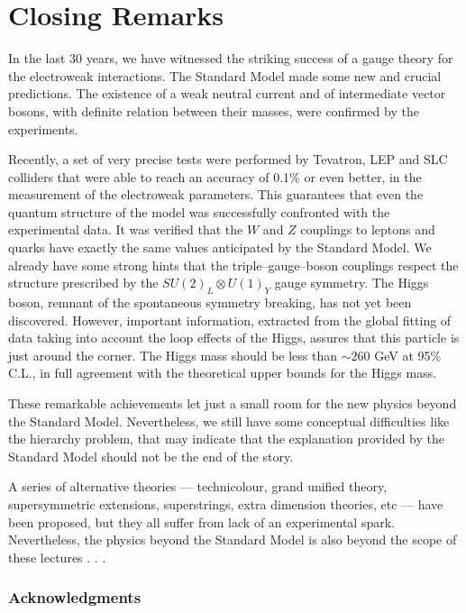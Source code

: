 \documentclass[12pt]{report}
\newcommand{\linha}{\enlargethispage{1\baselineskip}}
\begin{document}
\chapter{Closing Remarks} \indent

In the last 30 years, we have witnessed the striking success of a
gauge theory for the electroweak interactions. The Standard Model
made  some new and crucial predictions. The existence of a weak
neutral current and of intermediate vector bosons, with definite
relation between their masses, were confirmed by the experiments. 

Recently, a set of very precise tests were performed by Tevatron, LEP
and SLC colliders that were able to reach an accuracy of 0.1\% or
even better, in the measurement of the electroweak parameters. This
guarantees that even the quantum structure of the model was
successfully confronted with the experimental data. It was verified
that the $W$ and $Z$ couplings to leptons and quarks have exactly the
same values anticipated by the Standard Model. We already have some
strong hints that the triple--gauge--boson couplings respect the
structure prescribed by the $SU(2)_L \otimes U(1)_Y$ gauge symmetry.
The Higgs boson, remnant of the spontaneous symmetry breaking, has
not yet been discovered. However, important information, extracted
from the global fitting of data taking into account the loop effects
of the Higgs, assures that this particle is just around the corner.
The Higgs mass should be less than $\sim 260$ GeV at 95\% C.L., in
full agreement with the theoretical upper bounds for the Higgs mass.

These remarkable achievements let just a small room for the new
physics beyond the Standard Model. Nevertheless, we still have some
conceptual difficulties like the hierarchy problem, that may indicate
that the explanation provided by the Standard Model should not be
the end of the story. 

\linha

A series of alternative theories --- technicolour, grand unified
theory, supersymmetric extensions, superstrings, extra dimension
theories, etc --- have been proposed, but they all suffer from lack
of an experimental spark. Nevertheless, the physics beyond the
Standard Model is also beyond the scope of these lectures . . . 

\subsection*{Acknowledgments} \indent
\end{document}
